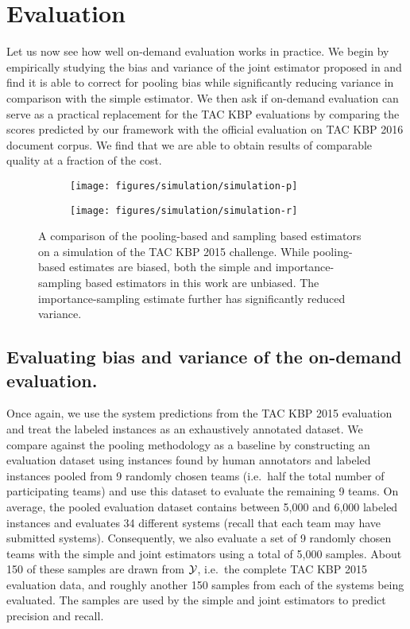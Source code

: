 \section{Evaluation}
\label{sec:evaluation}

Let us now see how well on-demand evaluation works in practice.
We begin by empirically studying the bias and variance of the joint estimator proposed in  and find it is able to correct for pooling bias while significantly reducing variance in comparison with the simple estimator.
We then ask if on-demand evaluation can serve as a practical replacement for the TAC KBP evaluations by comparing the scores predicted by our framework with the official evaluation on TAC KBP 2016 document corpus.
We find that we are able to obtain results of comparable quality at a fraction of the cost.

\begin{figure*}[t]
  \centering
  \begin{subfigure}{0.49\textwidth}
    \texttt{[image: figures/simulation/simulation-p]}
  \end{subfigure}
  \begin{subfigure}{0.49\textwidth}
    \texttt{[image: figures/simulation/simulation-r]}
  \end{subfigure}
  \caption{\label{fig:simulation}
  A comparison of the pooling-based and sampling based estimators on a simulation of the TAC KBP 2015 challenge.
  While pooling-based estimates are biased, both the simple and importance-sampling based estimators in this work are unbiased.
  The importance-sampling estimate further has significantly reduced variance. 
  }
\end{figure*}

\subsection{Evaluating bias and variance of the on-demand evaluation.}
Once again, we use the system predictions from the TAC KBP 2015 evaluation and treat the labeled instances as an exhaustively annotated dataset.
We compare against the pooling methodology as a baseline by constructing an evaluation dataset using instances found by human annotators and labeled instances pooled from 9 randomly chosen teams (i.e.\ half the total number of participating teams) and use this dataset to evaluate the remaining 9 teams.
On average, the pooled evaluation dataset contains between 5,000 and 6,000 labeled instances and evaluates 34 different systems (recall that each team may have submitted systems).
Consequently, we also evaluate a set of 9 randomly chosen teams with the simple and joint estimators using a total of 5,000 samples.
About 150 of these samples are drawn from $\mathcal{Y}$, i.e.\ the complete TAC KBP 2015 evaluation data, and roughly another 150 samples from each of the systems being evaluated.
The samples are used by the simple and joint estimators to predict precision and recall.

